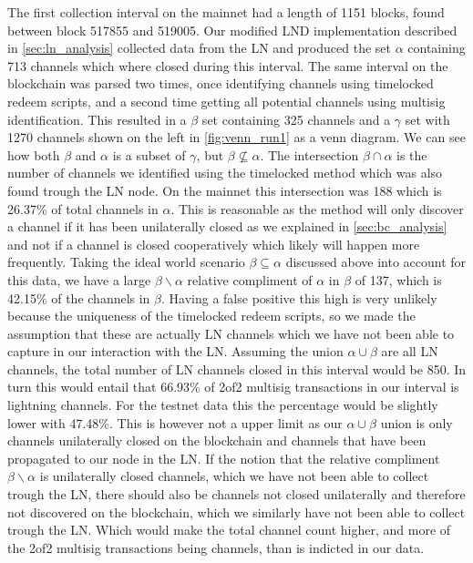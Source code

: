 The first collection interval on the mainnet had a length of 1151 blocks, found between block 517855 and 519005. Our modified LND implementation described in \cref{sec:ln_analysis} collected data from the LN and produced the set $\alpha$ containing 713 channels which where closed during this interval. The same interval on the blockchain was parsed two times, once identifying channels using timelocked redeem scripts, and a second time getting all potential channels using multisig identification. This resulted in a $\beta$ set containing 325 channels and a $\gamma$ set with 1270 channels shown on the left in \cref{fig:venn_run1} as a venn diagram. We can see how both $\beta$ and $\alpha$ is a subset of $\gamma$, but $\beta \not\subseteq \alpha$. The intersection $\beta \cap \alpha$ is the number of channels we identified using the timelocked method which was also found trough the LN node. On the mainnet this intersection was 188 which is 26.37\% of total channels in $\alpha$. This is reasonable as the method will only discover a channel if it has been unilaterally closed as we explained in \cref{sec:bc_analysis} and not if a channel is closed cooperatively which likely will happen more frequently. Taking the ideal world scenario $\beta \subseteq \alpha$ discussed above into account for this data, we have a large $\beta \backslash{} \alpha$ relative compliment of $\alpha$ in $\beta$ of 137, which is 42.15\% of the channels in $\beta$. Having a false positive this high is very unlikely because the uniqueness of the timelocked redeem scripts, so we made the assumption that these are actually LN channels which we have not been able to capture in our interaction with the LN. 
Assuming the union $\alpha \cup \beta$ are all LN channels, the total number of LN channels closed in this interval would be 850. In turn this would entail that 66.93\% of 2of2 multisig transactions in our interval is lightning channels. For the testnet data this the percentage would be slightly lower with 47.48\%.
This is however not a upper limit as our $\alpha \cup \beta$ union is only channels unilaterally closed on the blockchain and channels that have been propagated to our node in the LN. If the notion that the relative compliment $\beta \backslash{} \alpha$ is unilaterally closed channels, which we have not been able to collect trough the LN, there should also be channels not closed unilaterally and therefore not discovered on the blockchain, which we similarly have not been able to collect trough the LN. 
Which would make the total channel count higher, and more of the 2of2 multisig transactions being channels, than is indicted in our data.

